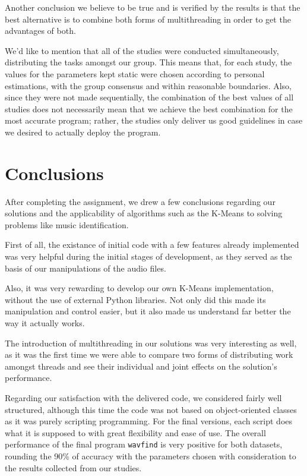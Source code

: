\documentclass[12pt]{article}
\begin{document}
Another conclusion we believe to be true and is verified by the results is that
the best alternative is to combine both forms of multithreading in order to get
the advantages of both.

\newpage
We'd like to mention that all of the studies were conducted simultaneously,
distributing the tasks amongst our group.
This means that, for each study, the values for the parameters kept static were
chosen according to personal estimations, with the group consensus and within
reasonable boundaries.
Also, since they were not made sequentially, the combination of the best values
of all studies does not necessarily mean that we achieve the best combination for
the most accurate program; rather, the studies only deliver us good guidelines
in case we desired to actually deploy the program.

\section*{Conclusions}

After completing the assignment, we drew a few conclusions regarding our 
solutions and the applicability of algorithms such as the K-Means to solving
problems like music identification.

First of all, the existance of initial code with a few features already 
implemented was very helpful during the initial stages of development, as they 
served as the basis of our manipulations of the audio files.

Also, it was very rewarding to develop our own K-Means implementation, without 
the use of external Python libraries. 
Not only did this made its manipulation and control easier, but it also made us 
understand far better the way it actually works.

The introduction of multithreading in our solutions was very interesting as well,
as it was the first time we were able to compare two forms of distributing work
amongst threads and see their individual and joint effects on the solution's 
performance.

Regarding our satisfaction with the delivered code, we considered fairly well 
structured, although this time the code was not based on object-oriented classes
as it was purely scripting programming.
For the final versions, each script does what it is supposed to with great 
flexibility and ease of use.
The overall performance of the final program \texttt{wavfind} is very positive for both
datasets, rounding the 90\% of accuracy with the parameters chosen with 
consideration to the results collected from our studies.
\end{document}
